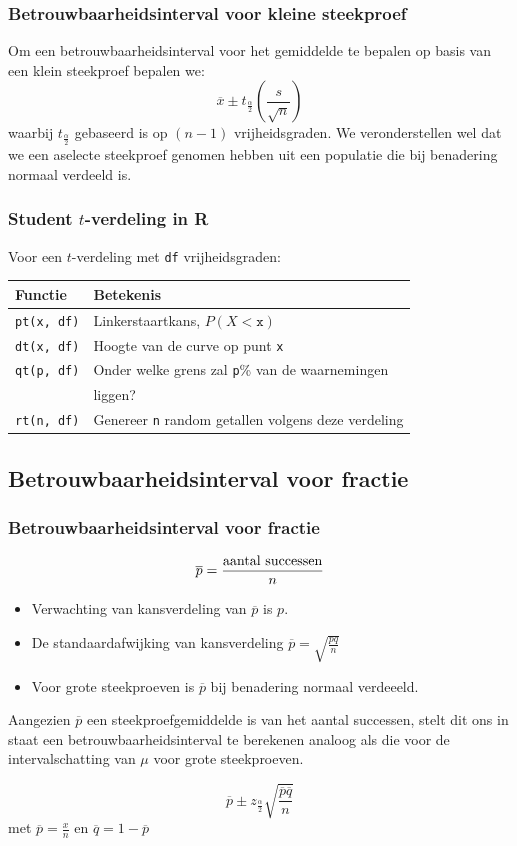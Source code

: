 \documentclass{beamer}
\begin{document}
\begin{frame}
  \frametitle{Betrouwbaarheidsinterval voor kleine steekproef}
    Om een betrouwbaarheidsinterval voor het gemiddelde te bepalen op basis van een klein steekproef bepalen we:
  \[ \overline{x} \pm t_{\frac{\alpha}{2}}(\frac{s}{\sqrt{n}}) \]
  waarbij $t_{\frac{\alpha}{2}}$ gebaseerd is op $(n-1)$ vrijheidsgraden. We veronderstellen wel dat we een aselecte steekproef genomen hebben uit
  een populatie die bij benadering normaal verdeeld is.
\end{frame}


\begin{frame}[fragile]
\frametitle{Student $t$-verdeling in R}

Voor een $t$-verdeling met \texttt{df} vrijheidsgraden:
\vfill
\centering
\begin{tabular}{ll}
	\textbf{Functie} & \textbf{Betekenis}                                         \\ \hline
	\verb|pt(x, df)| & Linkerstaartkans, $P(X<\mathtt{x})$                        \\
	\verb|dt(x, df)| & Hoogte van de curve op punt \texttt{x}                     \\
	\verb|qt(p, df)| & Onder welke grens zal \texttt{p}\% van de waarnemingen     \\
	                 & liggen?                                                    \\
	\verb|rt(n, df)| & Genereer \texttt{n} random getallen volgens deze verdeling
\end{tabular}

\end{frame}

\subsection{Betrouwbaarheidsinterval voor fractie}
\begin{frame}
  \frametitle{Betrouwbaarheidsinterval voor fractie}
  \[ \overline{p} = \frac{\textnormal{aantal successen}}{n} \]
  \begin{itemize}
  \item Verwachting van kansverdeling van $\overline{p}$ is $p$.
  \item De standaardafwijking van kansverdeling $\overline{p} = \sqrt{\frac{pq}{n}}$
  \item Voor grote steekproeven is $\overline{p}$ bij benadering normaal verdeeeld.
\end{itemize}
Aangezien $\overline{p}$ een steekproefgemiddelde is van het aantal successen, stelt dit ons in staat een betrouwbaarheidsinterval te berekenen analoog als die voor de intervalschatting van $\mu$ voor grote steekproeven.


  \[ \overline{p} \pm z_{\frac{\alpha}{2}} \sqrt{\frac{\overline{p}\overline{q}}{n}} \]
  met $\overline{p} = \frac{x}{n}$ en $\overline{q} = 1- \overline{p}$

\end{frame}
\end{document}
